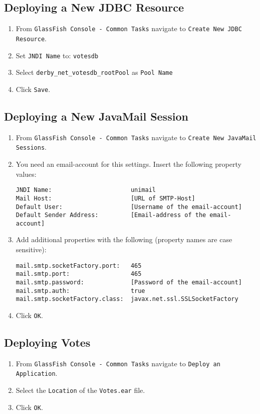 \subsection{Deploying a New JDBC Resource}

\begin{enumerate}

\item
From \texttt{GlassFish Console - Common Tasks} navigate to \texttt{Create New JDBC Resource}.

\item
Set \texttt{JNDI Name} to: \texttt{votesdb}

\item
Select \texttt{derby\_net\_votesdb\_rootPool} as \texttt{Pool Name}

\item
Click \texttt{Save}.

\end{enumerate}


\subsection{Deploying a New JavaMail Session}

\begin{enumerate}

\item
From \texttt{GlassFish Console - Common Tasks} navigate to \texttt{Create New JavaMail Sessions}.

\item
You need an email-account for this settings. Insert the following property values:
\begin{verbatim}
JNDI Name:                      unimail
Mail Host:                      [URL of SMTP-Host]
Default User:                   [Username of the email-account]
Default Sender Address:         [Email-address of the email-account]

\end{verbatim}

\item
Add additional properties with the following (property names are case sensitive):
\begin{verbatim}
mail.smtp.socketFactory.port:   465
mail.smtp.port:                 465
mail.smtp.password:             [Password of the email-account]
mail.smtp.auth:                 true
mail.smtp.socketFactory.class:  javax.net.ssl.SSLSocketFactory
\end{verbatim}

\item
Click \texttt{OK}.


\end{enumerate}

\subsection{Deploying Votes}

\begin{enumerate}

\item
From \texttt{GlassFish Console - Common Tasks} navigate to \texttt{Deploy an Application}.

\item
Select the \texttt{Location} of the \texttt{Votes.ear} file.

\item
Click \texttt{OK}.

\end{enumerate}